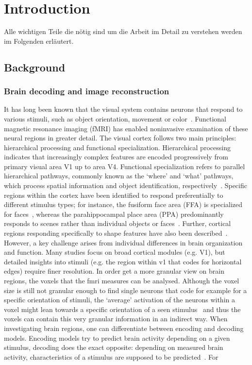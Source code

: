 \chapter{Introduction}

Alle wichtigen Teile die nötig sind um die Arbeit im Detail zu verstehen werden im Folgenden erläutert. 

\section{Background}

\subsection{Brain decoding and image reconstruction}

It has long been known that the visual system contains neurons that respond to various stimuli, such as object orientation, movement or color~\cite{grill-spectorHUMANVISUALCORTEX2004}. Functional magnetic resonance imaging (fMRI) has enabled noninvasive examination of these neural regions in greater detail. The visual cortex follows two main principles: hierarchical processing and functional specialization. Hierarchical processing indicates that increasingly complex features are encoded progressively from primary visual area V1 up to area V4. Functional specialization refers to parallel hierarchical pathways, commonly known as the `where' and `what' pathways, which process spatial information and object identification, respectively~\cite{grill-spectorHUMANVISUALCORTEX2004,ungerleiderWhatWhereHuman1994}. Specific regions within the cortex have been identified to respond preferentially to different stimulus types; for instance, the fusiform face area (FFA) is specialized for faces~\cite{kanwisherFusiformFaceArea1997}, whereas the parahippocampal place area (PPA) predominantly responds to scenes rather than individual objects or faces~\cite{epsteinCorticalRepresentationLocal1998}. Further, cortical regions responding specifically to shape features have also been described~\cite{kourtziCorticalRegionsInvolved2000}. However, a key challenge arises from individual differences in brain organization and function. Many studies focus on broad cortical modules (e.g. V1), but detailed insights into stimuli (e.g. the region within v1 that codes for horizontal edges) require finer resolution. In order get a more granular view on brain regions, the voxels that the fmri measures can be analysed. Although the voxel size is still not granular enough to find single neurons that code for example for a specific orientation of stimuli, the `average' activation of the neurons within a voxel might lean towards a specific orientation of a seen stimulus~\cite{kamitaniDecodingVisualSubjective2005} and thus the voxels can contain this very granular information in an indirect way. When investigating brain regions, one can differentiate between encoding and decoding models. Encoding models try to predict brain activity depending on a given stimulus, decoding does the exact opposite: depending on measured brain activity, characteristics of a stimulus are supposed to be predicted~\cite{naselarisEncodingDecodingFMRI2011}. For 